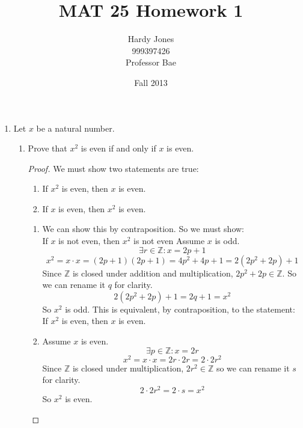 \documentclass[12pt]{article}
\begin{document}
\title{MAT 25 Homework 1}
\author{Hardy Jones\\
        999397426\\
        Professor Bae}
\date{Fall 2013}

\maketitle

\begin{enumerate}
    \item Let $x$ be a natural number.
    \begin{enumerate}
        \item Prove that $x^2$ is even if and only if $x$ is even.

            \begin{proof}

                We must show two statements are true:
                \begin{enumerate}
                    \item If $x^2$ is even, then $x$ is even.
                    \item If $x$ is even, then $x^2$ is even.
                \end{enumerate}


                \begin{enumerate}
                    \item
                        We can show this by contraposition.
                        So we must show: \\
                        If $x$ is not even, then $x^2$ is not even
                        Assume $x$ is odd.
                        \[\exists r \in \mathbb{Z} : x = 2p + 1\]
                        \[
                            x^2 = x \cdot x = (2p + 1) (2p + 1) =
                            4p^2 + 4p + 1 = 2(2p^2 + 2p) + 1
                        \]
                        Since $\mathbb{Z}$ is closed under
                        addition and multiplication, $2p^2 + 2p \in \mathbb{Z}$.
                        So we can rename it $q$ for clarity.
                        \[2(2p^2 + 2p) + 1 = 2q + 1 = x^2\]
                        So $x^2$ is odd.
                        This is equivalent, by contraposition, to the statement: \\
                        If $x^2$ is even, then $x$ is even.

                    \item
                        Assume $x$ is even.
                        \[\exists p \in \mathbb{Z} : x = 2r\]
                        \[x^2 = x \cdot x = 2r \cdot 2r = 2 \cdot 2r^2\]
                        Since $\mathbb{Z}$ is closed under multiplication,
                        $2r^2 \in \mathbb{Z}$ so we can rename it $s$
                        for clarity.
                        \[2 \cdot 2r^2 = 2 \cdot s = x^2\]
                        So $x^2$ is even.
                \end{enumerate}


\end{proof}
\end{enumerate}
\end{enumerate}
\end{document}
